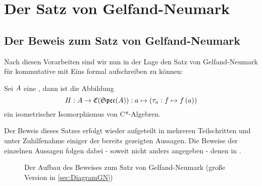 \section{Der Satz von Gelfand-Neumark}\label{sec:GN}









\subsection{Der Beweis zum Satz von Gelfand-Neumark}

Nach diesen Vorarbeiten sind wir nun in der Lage den Satz von Gelfand-Neumark für kommutative \CAlgn{} mit Eins formal aufschreiben zu können: 

\begin{satz}\label{satz:GN}
Sei $A$ eine \CAlg, dann ist die Abbildung
\[H: A \to \mathfrak{C}(\mathfrak{Spec}(A)): a \mapsto \left(\tau_a: f \mapsto f\left(a\right)\right)\]
ein isometrischer Isomorphismus von C*-Algebren.
\end{satz}

Der Beweis dieses Satzes erfolgt wieder aufgeteilt in mehreren Teilschritten und unter Zuhilfenahme einiger der bereits gezeigten Aussagen. Die Beweise der einzelnen Aussagen folgen dabei - soweit nicht anders angegeben - denen in \cite[S. 49-69]{Baer2003}.
\begin{figure}[h]
\begin{tiny}
	
\end{tiny}
	\caption{Der Aufbau des Beweises zum Satz von Gelfand-Neumark (große Version in \cref{sec:DiagramGN})}
\end{figure}







